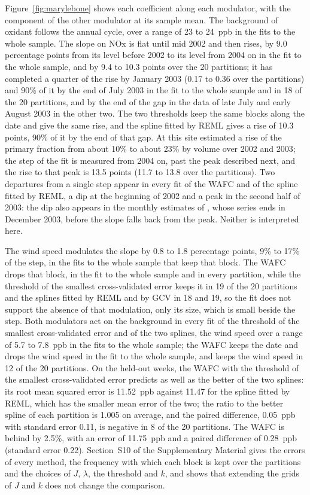 \documentclass[12pt]{article} %
\theoremstyle{definition}
\theoremstyle{plain}
\newcommand{\pen}{\lambda}
\begin{document}
{Figure~\ref{fig:marylebone} shows each coefficient along each modulator, with
the component of the other modulator at its sample mean. The background of
oxidant follows the annual cycle, over a range of 23 to 24~ppb in the fits to
the whole sample. The slope on NOx is flat until mid 2002 and then rises, by
9.0 percentage points from its level before 2002 to its level from 2004 on in
the fit to the whole sample, and by 9.4 to 10.3 points over the 20
partitions; it has completed a quarter of the rise by January 2003 (0.17 to
0.36 over the partitions) and 90\% of it by the end of July 2003 in the fit
to the whole sample and in 18 of the 20 partitions, and by the end of the gap
in the data of late July and early August 2003 in the other two. The two
thresholds keep the same blocks along the date and give the same rise, and
the spline fitted by REML gives a rise of 10.3 points, 90\% of it by the end
of that gap. At
this site \citet[Figure~3(a)]{Carslaw-2005} estimated a rise of the primary
fraction from about 10\% to about 23\% by volume over 2002 and 2003; the step
of the fit is measured from 2004 on, past the peak described next, and the
rise to that peak is 13.5 points (11.7 to 13.8 over the partitions). Two
departures from a single step appear in every fit of the WAFC and of the
spline fitted by REML, a dip at the beginning of 2002 and a peak in the
second half of 2003: the dip also appears in the monthly estimates of
\citet[Figure~3(a)]{Carslaw-2005}, whose series ends in December 2003,
before the slope falls back from the peak. Neither is interpreted here.

The wind speed modulates the slope by 0.8 to 1.8 percentage points, 9\% to
17\% of the step, in the fits to the whole sample that keep that block. The
WAFC drops that block, in the fit to the whole sample and in every partition,
while the threshold of the smallest cross-validated error keeps it in 19 of
the 20 partitions and the splines fitted by REML and by GCV in 18 and 19, so
the fit does not support the absence of that modulation, only its size,
which is small beside the step. Both modulators act on the background in
every fit of the threshold of the smallest cross-validated error and of the
two splines, the wind speed over a range of 5.7 to 7.8~ppb in the fits to
the whole sample; the WAFC keeps the date and drops the wind speed in the
fit to the whole sample, and keeps the wind speed in 12 of the 20
partitions. On the held-out weeks, the WAFC with the threshold of the
smallest cross-validated error predicts as well as the better of the two
splines: its root mean squared error is 11.52~ppb against 11.47 for the
spline fitted by REML, which has the smaller mean error of the two; the
ratio to the better spline of each partition is 1.005 on average, and the
paired difference, 0.05~ppb with standard error 0.11, is negative in 8 of
the 20 partitions. The WAFC is behind by 2.5\%, with an error of 11.75~ppb
and a paired difference of 0.28~ppb (standard error 0.22). Section~S10 of the
Supplementary Material gives the errors of every method, the frequency with
which each block is kept over the partitions and the choices of $J$, $\pen$,
the threshold and $k$, and shows that extending the grids of $J$ and $k$ does
not change the comparison.

}
\end{document}
